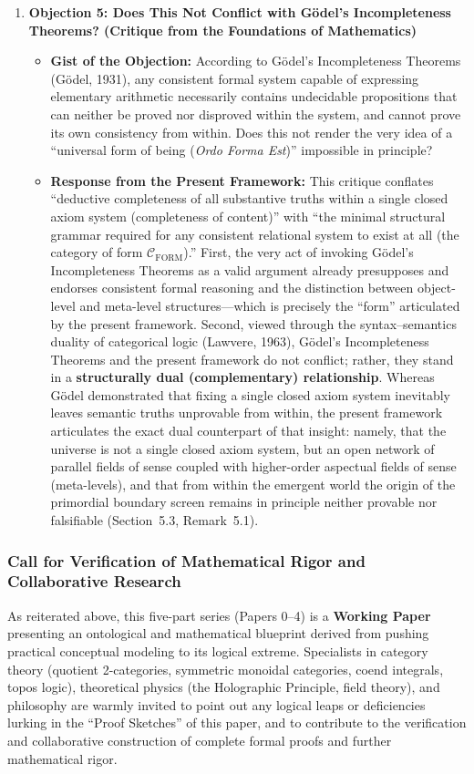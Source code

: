\documentclass[11pt,a4paper]{article}
\theoremstyle{definition}
\theoremstyle{plain}
\begin{document}
\begin{enumerate}
    \item \textbf{Objection 5: Does This Not Conflict with G\"odel's Incompleteness Theorems? (Critique from the Foundations of Mathematics)}
    \begin{itemize}
        \item \textbf{Gist of the Objection:} According to G\"odel's Incompleteness Theorems (G\"odel, 1931), any consistent formal system capable of expressing elementary arithmetic necessarily contains undecidable propositions that can neither be proved nor disproved within the system, and cannot prove its own consistency from within. Does this not render the very idea of a ``universal form of being (\textit{Ordo Forma Est})'' impossible in principle?
        \item \textbf{Response from the Present Framework:} This critique conflates ``deductive completeness of all substantive truths within a single closed axiom system (completeness of content)'' with ``the minimal structural grammar required for any consistent relational system to exist at all (the category of form $\mathcal{C}_{\mathrm{FORM}}$).'' First, the very act of invoking G\"odel's Incompleteness Theorems as a valid argument already presupposes and endorses consistent formal reasoning and the distinction between object-level and meta-level structures---which is precisely the ``form'' articulated by the present framework. Second, viewed through the syntax--semantics duality of categorical logic (Lawvere, 1963), G\"odel's Incompleteness Theorems and the present framework do not conflict; rather, they stand in a \textbf{structurally dual (complementary) relationship}. Whereas G\"odel demonstrated that fixing a single closed axiom system inevitably leaves semantic truths unprovable from within, the present framework articulates the exact dual counterpart of that insight: namely, that the universe is not a single closed axiom system, but an open network of parallel fields of sense coupled with higher-order aspectual fields of sense (meta-levels), and that from within the emergent world the origin of the primordial boundary screen remains in principle neither provable nor falsifiable (Section~5.3, Remark~5.1).
    \end{itemize}
\end{enumerate}

\subsubsection*{Call for Verification of Mathematical Rigor and Collaborative Research}
As reiterated above, this five-part series (Papers 0--4) is a \textbf{Working Paper} presenting an ontological and mathematical blueprint derived from pushing practical conceptual modeling to its logical extreme. Specialists in category theory (quotient 2-categories, symmetric monoidal categories, coend integrals, topos logic), theoretical physics (the Holographic Principle, field theory), and philosophy are warmly invited to point out any logical leaps or deficiencies lurking in the ``Proof Sketches'' of this paper, and to contribute to the verification and collaborative construction of complete formal proofs and further mathematical rigor.
\end{document}
